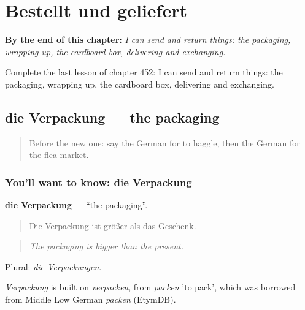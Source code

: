 
\chapter{Bestellt und geliefert}
\label{ch:ge-bestellt-und-geliefert}

\begin{chapteropening}
\textbf{By the end of this chapter:} \emph{I can send and return things: the packaging, wrapping up, the cardboard box, delivering and exchanging.}

Complete the last lesson of chapter 452: I can send and return things: the packaging, wrapping up, the cardboard box, delivering and exchanging.
\end{chapteropening}

\section[die Verpackung]{die Verpackung — the packaging}

\label{lesson:GE-C452-verpackung}



\begin{quote}
Before the new one: say the German for to haggle, then the German for the flea market.
\end{quote}

\subsection*{You'll want to know: die Verpackung}
\textbf{die Verpackung} — \textquotedblleft{}the packaging\textquotedblright{}.

\begin{quote}
Die Verpackung ist größer als das Geschenk.
\end{quote}

\begin{quote}
\emph{The packaging is bigger than the present.}
\end{quote}

Plural: \emph{die Verpackungen}.

\begin{cousinweb}
\emph{Verpackung} is built on \emph{verpacken}, from \emph{packen} 'to pack', which was borrowed from Middle Low German \emph{packen} (EtymDB).
\end{cousinweb}


